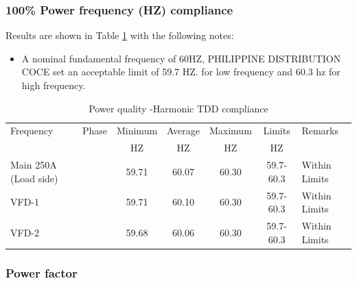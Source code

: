 \subsubsection{100\% Power frequency (HZ) compliance}

Results are shown in Table \ref{tbl_ch04_elecaudit_powerquality_frequency} with the following notes:

\begin{itemize}
	\item A nominal fundamental frequency of 60HZ, PHILIPPINE DISTRIBUTION COCE set an acceptable limit of 59.7 HZ. for low frequency and 60.3 hz for high frequency.
	
\end{itemize}

\begin{table}[!htb]
	\caption{Power quality -Harmonic TDD compliance}
	\label{tbl_ch04_elecaudit_powerquality_frequency}
	{\scriptsize
		\begin{tabular}{l|l|l|l|l|l|l}
			\hline
			Frequency & \multicolumn{1}{c|}{Phase} & \multicolumn{1}{c|}{Minimum} & \multicolumn{1}{c|}{Average} & \multicolumn{1}{c|}{Maximum} & \multicolumn{1}{c|}{Limits} & Remarks \\ 
			& \multicolumn{1}{c|}{} & \multicolumn{1}{c|}{HZ} & \multicolumn{1}{c|}{HZ} & \multicolumn{1}{c|}{HZ} & \multicolumn{1}{c|}{HZ} &  \\ 
			\hline
			Main 250A (Load side) & \multicolumn{1}{c|}{} & \multicolumn{1}{c|}{59.71} & \multicolumn{1}{c|}{60.07} & \multicolumn{1}{c|}{60.30} & \multicolumn{1}{c|}{59.7-60.3} & Within  Limits \\ 
			\hline
			VFD-1 & \multicolumn{1}{c|}{} & \multicolumn{1}{c|}{59.71} & \multicolumn{1}{c|}{60.10} & \multicolumn{1}{c|}{60.30} & \multicolumn{1}{c|}{59.7-60.3} & Within  Limits \\ 
			\hline
			VFD-2 & \multicolumn{1}{c|}{} & \multicolumn{1}{c|}{59.68} & \multicolumn{1}{c|}{60.06} & \multicolumn{1}{c|}{60.30} & \multicolumn{1}{c|}{59.7-60.3} & Within  Limits \\ 
			\hline
		\end{tabular}
		
		
	}%
\end{table}



\subsubsection{Power factor}

